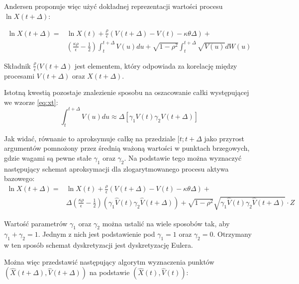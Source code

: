 \documentclass{pracamgr}
\begin{document}
{Andersen proponuje więc użyć dokładnej reprezentacji wartości procesu $\ln X(t + \Delta)$:

\begin{equation}
\begin{aligned}
\label{eq:xt}
\ln X(t + \Delta) = & \ln X(t)  + \frac{\rho}{\epsilon} (V(t + \Delta)  - V(t) - \kappa \theta \Delta) + \\
& (\frac{\kappa \rho}{\epsilon} - \frac{1}{2})
\int_t^{t+\Delta} V(u) du + \sqrt{1-\rho^2} \int_t^{t+\Delta} \sqrt{V(u)}dW(u)
\end{aligned}
\end{equation}

Składnik $\frac{\rho}{\epsilon} (V(t + \Delta)$ jest elementem, który odpowiada za korelację między 
procesami $V(t + \Delta)$ oraz $X(t + \Delta)$.

Istotną kwestią pozostaje znalezienie sposobu na oszacowanie całki występującej we wzorze \ref{eq:xt}:
\begin{equation}
  \int_t^{t+\Delta}  V(u) du \approx \Delta [\gamma_1 V(t) \gamma_2 V(t + \Delta)]
\end{equation}

Jak widać, równanie to aproksymuje całkę na przedziale $[t; t + \Delta$ 
jako przyrost argumentów pomnożony przez średnią ważoną wartości w punktach brzegowych, gdzie wagami 
są pewne stałe $\gamma_1$ oraz $\gamma_2$. Na podstawie tego można wyznaczyć następujący schemat aproksymacji
dla zlogarytmowanego procesu aktywa bazowego:
\begin{equation}
\begin{aligned}
\label{eq:xhatt}
\ln X(t + \Delta) = & \ln X(t)  + \frac{\rho}{\epsilon} (V(t + \Delta)  - V(t) - \kappa \theta \Delta) + \\
& \Delta (\frac{\kappa \rho}{\epsilon} - \frac{1}{2}) (\gamma_1 \hat{V}(t) \gamma_2 \hat{V}(t + \Delta))
 +  \sqrt{1-\rho^2} \sqrt{\gamma_1 \hat{V}(t) \gamma_2 \hat{V}(t + \Delta)} \cdot Z
\end{aligned}
\end{equation}

Wartość parametrów $\gamma_1$ oraz $\gamma_2$ można ustalić na wiele sposobów tak, aby $\gamma_1 + \gamma_2 = 1$. 
Jednym z nich jest podstawienie pod $\gamma_1 = 1$ oraz $\gamma_2 = 0$. Otrzymany w ten sposób schemat dyskretyzacji jest  dyskretyzację Eulera. 

Można więc przedstawić następujący algorytm wyznaczenia punktów $(\hat{X}(t+ \Delta), \hat{V}(t+ \Delta))$ na podstawie $(\hat{X}(t), \hat{V}(t))$:

}
\end{document}
